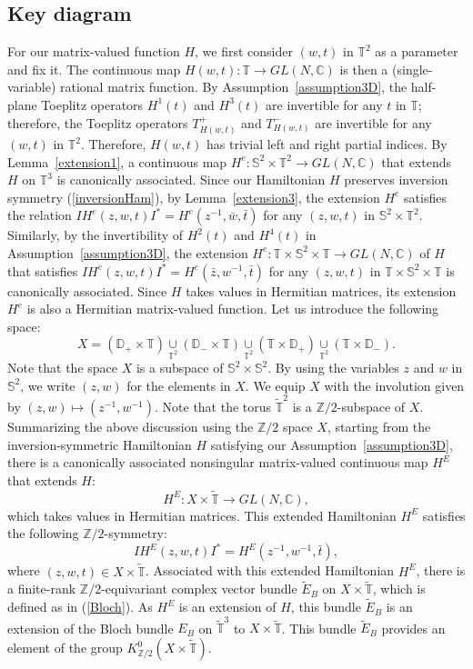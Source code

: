 \documentclass{amsart}
\theoremstyle{plain}
\theoremstyle{definition}
\theoremstyle{remark}
\newcommand{\Z}{\mathbb{Z}}
\newcommand{\C}{\mathbb{C}}
\newcommand{\T}{\mathbb{T}}
\newcommand{\D}{\mathbb{D}}
\newcommand{\SSS}{\mathbb{S}}
\newcommand{\tT}{\widetilde{\T}}
\newcommand{\Bloch}{E_B}
\newcommand{\eBloch}{\widetilde{E}_B}
\begin{document}
\subsection{Key diagram}
\label{Sect3.2}
For our matrix-valued function $H$, we first consider $(w,t)$ in $\T^2$ as a parameter and fix it.
The continuous map $H(w,t) \colon \T \to GL(N,\C)$ is then a (single-variable) rational matrix function.
By Assumption~\ref{assumption3D}, the half-plane Toeplitz operators $H^1(t)$ and $H^3(t)$ are invertible for any $t$ in $\T$; therefore, the Toeplitz operators $T^+_{H(w,t)}$ and $T^-_{H(w,t)}$ are invertible for any $(w,t)$ in $\T^2$.
Therefore, $H(w,t)$ has trivial left and right partial indices.
By Lemma~\ref{extension1}, a continuous map $H^e \colon \SSS^2 \times \T^2 \to GL(N,\C)$ that extends $H$ on $\T^3$ is canonically associated.
Since our Hamiltonian $H$ preserves inversion symmetry (\ref{inversionHam}), by Lemma~\ref{extension3}, the extension $H^e$ satisfies the relation $IH^e(z,w,t)I^* = H^e(z^{-1}, \bar{w}, \bar{t})$ for any $(z,w,t)$ in $\SSS^2 \times \T^2$.
Similarly, by the invertibility of $H^2(t)$ and $H^4(t)$ in Assumption~\ref{assumption3D}, the extension $H^e \colon \T \times \SSS^2 \times \T \to GL(N,\C)$ of $H$ that satisfies $IH^e(z,w,t)I^* = H^e(\bar{z}, w^{-1}, \bar{t})$ for any $(z,w,t)$ in $\T \times \SSS^2 \times \T$ is canonically associated.
Since $H$ takes values in Hermitian matrices, its extension $H^e$ is also a Hermitian matrix-valued function.
Let us introduce the following space:
\begin{equation}
\label{X}
	X = (\D_+ \times \T) \underset{\T^2}{\cup}
		(\D_- \times \T) \underset{\T^2}{\cup}
			(\T \times \D_+)	 \underset{\T^2}{\cup}
				(\T \times \D_-).
\end{equation}
Note that the space $X$ is a subspace of $\SSS^2 \times \SSS^2$.
By using the variables $z$ and $w$ in $\SSS^2$, we write $(z,w)$ for the elements in $X$.
We equip $X$ with the involution given by $(z,w) \mapsto (z^{-1}, w^{-1})$.
Note that the torus $\tT^2$ is a $\Z/2$-subspace of $X$.
Summarizing the above discussion using the $\Z/2$ space $X$, starting from the inversion-symmetric Hamiltonian $H$ satisfying our Assumption~\ref{assumption3D}, there is a canonically associated nonsingular matrix-valued continuous map $H^E$ that extends $H$:
\begin{equation*}
	H^E \colon X \times \tT \to GL(N,\C),
\end{equation*}
which takes values in Hermitian matrices.
This extended Hamiltonian $H^E$ satisfies the following $\Z/2$-symmetry:
\begin{equation*}
	I H^E(z, w, t) I^* = H^E(z^{-1}, w^{-1}, \bar{t}),
\end{equation*}
where $(z,w,t) \in X \times \tT$.
Associated with this extended Hamiltonian $H^E$, there is a finite-rank $\Z/2$-equivariant complex vector bundle $\eBloch$ on $X \times \tT$, which is defined as in (\ref{Bloch}).
As $H^E$ is an extension of $H$, this bundle $\eBloch$ is an extension of the Bloch bundle $\Bloch$ on $\tT^3$ to $X \times \tT$.
This bundle $\eBloch$ provides an element of the group $K^0_{\Z/2}(X \times \tT)$.
\end{document}
